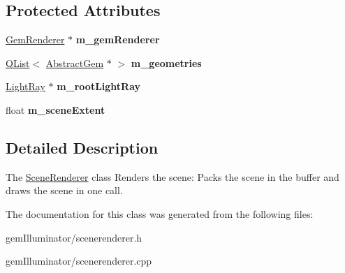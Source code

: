 \subsection*{Protected Attributes}
\begin{DoxyCompactItemize}
\item 
\hypertarget{class_scene_renderer_adf73dd839ccd615bf377b8dba695255e}{}\hyperlink{class_gem_renderer}{Gem\+Renderer} $\ast$ {\bfseries m\+\_\+gem\+Renderer}\label{class_scene_renderer_adf73dd839ccd615bf377b8dba695255e}

\item 
\hypertarget{class_scene_renderer_af2d4ded15e32fd485295fc0531645dc1}{}\hyperlink{class_q_list}{Q\+List}$<$ \hyperlink{class_abstract_gem}{Abstract\+Gem} $\ast$ $>$ {\bfseries m\+\_\+geometries}\label{class_scene_renderer_af2d4ded15e32fd485295fc0531645dc1}

\item 
\hypertarget{class_scene_renderer_aec10558966df8efad69726e9b06d0cfd}{}\hyperlink{class_light_ray}{Light\+Ray} $\ast$ {\bfseries m\+\_\+root\+Light\+Ray}\label{class_scene_renderer_aec10558966df8efad69726e9b06d0cfd}

\item 
\hypertarget{class_scene_renderer_ae9cdbec278ec42dac41c7f1d9d75388f}{}float {\bfseries m\+\_\+scene\+Extent}\label{class_scene_renderer_ae9cdbec278ec42dac41c7f1d9d75388f}

\end{DoxyCompactItemize}


\subsection{Detailed Description}
The \hyperlink{class_scene_renderer}{Scene\+Renderer} class  Renders the scene\+: Packs the scene in the buffer and draws the scene in one call. 

The documentation for this class was generated from the following files\+:\begin{DoxyCompactItemize}
\item 
gem\+Illuminator/scenerenderer.\+h\item 
gem\+Illuminator/scenerenderer.\+cpp\end{DoxyCompactItemize}

